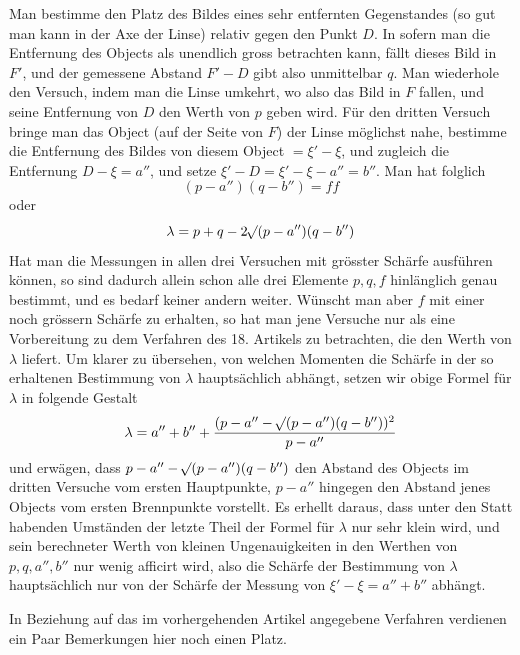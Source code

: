Man bestimme den Platz des Bildes eines sehr entfernten Gegenstandes (so gut man kann in der Axe der Linse) relativ gegen den Punkt $D$. In sofern man die Entfernung des Objects als unendlich gross betrachten kann, fällt dieses Bild
in $F'$, und der gemessene Abstand $F'-D$ gibt also unmittelbar $q$. Man wiederhole den Versuch, indem man die Linse umkehrt, wo also das Bild in $F$ fallen, und seine Entfernung von $D$ den Werth von $p$ geben wird. Für den dritten Versuch bringe man das Object (auf der Seite von $F$) der Linse möglichst nahe, bestimme die Entfernung des Bildes von diesem Object $=\xi'-\xi$, und zugleich die Entfernung $D-\xi=a''$, und setze $\xi'-D=\xi'-\xi-a''=b''$. Man hat folglich
\[
(p-a'')(q-b'')=ff
\]
oder
\[
\lambda=p+q-2\mathord{{}^{}\!\surd}(p-a'')(q-b'')
\]
Hat man die Messungen in allen drei Versuchen mit grösster Schärfe ausführen können, so sind dadurch allein schon alle drei Elemente $p,q,f$ hinlänglich genau bestimmt, und es bedarf keiner andern weiter. Wünscht man aber $f$ mit einer noch grössern Schärfe zu erhalten, so hat man jene Versuche nur als eine Vorbereitung zu dem Verfahren des 18. Artikels zu betrachten, die den Werth von $\lambda$ liefert. Um klarer zu übersehen, von welchen Momenten die Schärfe in der so erhaltenen Bestimmung von $\lambda$ hauptsächlich abhängt, setzen wir obige Formel für $\lambda$ in folgende Gestalt
\[
\lambda=a''+b''+\frac{(p-a''-\mathord{{}^{}\!\surd}(p-a'')(q-b''))^2}{p-a''}
\]
und erwägen, dass $p-a''-\mathord{{}^{}\!\surd}(p-a'')(q-b'')$ den Abstand des Objects im dritten Versuche vom ersten Hauptpunkte, $p-a''$ hingegen den Abstand jenes Objects vom ersten Brennpunkte vorstellt. Es erhellt daraus, dass unter den Statt habenden Umständen der letzte Theil der Formel für $\lambda$ nur sehr klein wird, und sein berechneter Werth von kleinen Ungenauigkeiten in den Werthen von $p,q,a'',b''$ nur wenig afficirt wird, also die Schärfe der Bestimmung von $\lambda$ hauptsächlich nur von der Schärfe der Messung von $\xi'-\xi=a''+b''$ abhängt.

In Beziehung auf das im vorhergehenden Artikel angegebene Verfahren verdienen ein Paar Bemerkungen hier noch einen Platz.

